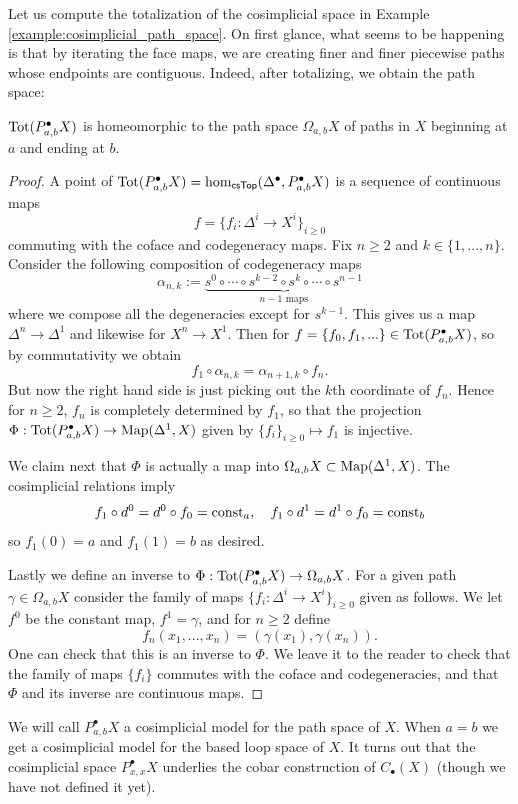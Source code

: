 Let us compute the totalization of the cosimplicial space in Example \ref{example:cosimplicial_path_space}. On first glance, what seems to be happening is that by iterating the face maps, we are creating finer and finer piecewise paths whose endpoints are contiguous. Indeed, after totalizing, we obtain the path space:
\begin{prop}
  $\operatorname{Tot}(P_{a,b}^\bullet X)$ is homeomorphic to the path space $\Omega_{a,b}X$ of paths in $X$ beginning at $a$ and ending at $b$.
  \begin{proof}
    A point of $\operatorname{Tot}(P_{a,b}^\bullet X) = \hom_{\mathsf{csTop}}(\Delta^\bullet, P_{a,b}^\bullet X)$ is a sequence of continuous maps 
    \[f= \{f_i: \Delta^i \to X^i\}_{i \geq 0}\]
    commuting with the coface and codegeneracy maps. Fix $n\geq 2$ and $k \in \{1, ..., n\}$. Consider the following composition of codegeneracy maps
    \[\alpha_{n,k} :=  \underbrace{s^{0} \circ \cdots \circ s^{k-2} \circ s^k\circ\cdots \circ s^{n-1}}_{\text{$n-1$ maps}}\]
    where we compose all the degeneracies except for $s^{k-1}$. This gives us a map $\Delta^n\to \Delta^1$ and likewise for $X^n\to X^1$. Then for $f  = \{f_0, f_1, ...\} \in \operatorname{Tot}(P_{a,b}^\bullet X)$, so by commutativity we obtain
    \[f_1 \circ \alpha_{n,k}  = \alpha_{n+1,k}\circ f_n.\]
    But now the right hand side is just picking out the $k$th coordinate of $f_n$. Hence for $n \geq 2$, $f_n$ is completely determined by $f_1$, so that the projection $\Phi: \operatorname{Tot}(P_{a,b}^\bullet X)\to \operatorname{Map}(\Delta^1, X)$ given by $\{f_i\}_{i\geq 0} \mapsto f_1$ is injective.

    We claim next that $\Phi$ is actually a map into $\Omega_{a,b}X\subset \operatorname{Map}(\Delta^1, X)$. The cosimplicial relations imply
    \[f_1\circ d^0 = d^0 \circ f_0 = \mathrm{const}_a, \quad f_1 \circ d^1 = d^1\circ f_0 = \mathrm{const}_b\]
    so $f_1(0) = a$ and $f_1(1) = b$ as desired. 
    
    Lastly we define an inverse to $\Phi: \operatorname{Tot}(P^\bullet_{a,b}X) \to \Omega_{a,b}X$. For a given path $\gamma \in \Omega_{a,b}X$ consider the family of maps $\{f_i: \Delta^i \to X^i\}_{i\geq 0}$ given as follows. We let $f^0$ be the constant map, $f^1 = \gamma$, and for $n \geq 2$ define
    \[f_n(x_1, ..., x_n) = (\gamma(x_1), \gamma(x_n)).\]
    One can check that this is an inverse to $\Phi$. We leave it to the reader to check that the family of maps $\{f_i\}$ commutes with the coface and codegeneracies, and that $\Phi$ and its inverse are continuous maps. 
  \end{proof}
\end{prop}
We will call $P_{a,b}^\bullet X$ a cosimplicial model for the path space of $X$. When $a=b$ we get a cosimplicial model for the based loop space of $X$. It turns out that the cosimplicial space $P_{x,x}^\bullet X$ underlies the cobar construction of $C_\bullet(X)$ (though we have not defined it yet). 

